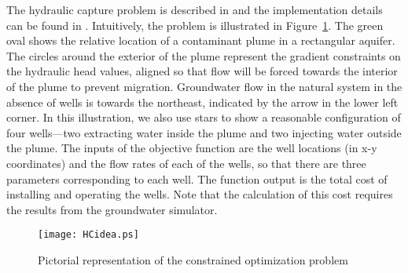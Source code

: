 \documentclass[12pt]{article}
\begin{document}
The hydraulic capture problem is described in
\cite{maye:kell:mill:2002} and the implementation details can be found
in \cite{fowl:2008}.  Intuitively, the problem is illustrated in
Figure~\ref{fig:HCidea}.  The green oval shows the relative location
of a contaminant plume in a rectangular aquifer. The circles around
the exterior of the plume represent the gradient constraints on the
hydraulic head values, aligned so that flow will be forced towards the
interior of the plume to prevent migration.  Groundwater flow in the
natural system in the absence of wells is towards the northeast,
indicated by the arrow in the lower left corner. In this illustration,
we also use stars to show a reasonable configuration of four
wells---two extracting water inside the plume and two injecting water
outside the plume.  The inputs of the objective function are the well
locations (in x-y coordinates) and the flow rates of each of the
wells, so that there are three parameters corresponding to each well.
The function output is the total cost of installing and operating the
wells.  Note that the calculation of this cost requires the results
from the groundwater simulator.

\begin{figure}[htb]
\begin{center}
\texttt{[image: HCidea.ps]}
\end{center}
\caption{Pictorial representation of the constrained optimization problem}
\label{fig:HCidea}
\end{figure}
\end{document}
